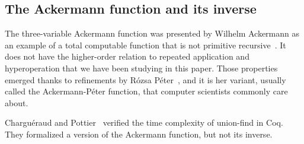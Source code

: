\subsection{The Ackermann function and its inverse}
The three-variable Ackermann function was presented by
Wilhelm Ackermann as an example of a total computable function that
is not primitive recursive~\cite{ackermann}.
It does not have the higher-order
relation to repeated application and hyperoperation that we have been studying in
this paper. Those properties emerged thanks to refinements by Rózsa Péter~\cite{peter},
and it is her variant, usually called the Ackermann-Péter function,
that computer scientists commonly care about.


Chargu\'eraud and Pottier~\cite{charpott}
verified the time complexity of union-find in Coq.
They formalized a version of the Ackermann function, but not its inverse.

